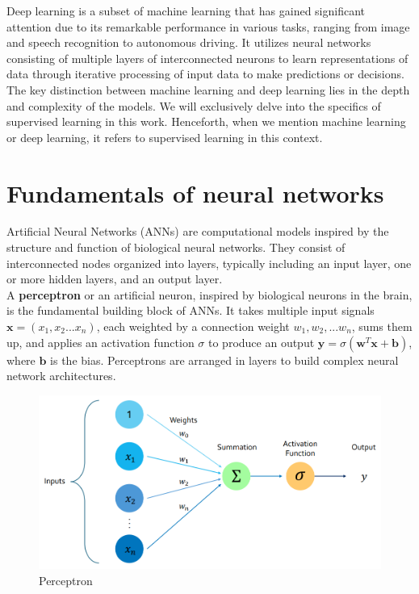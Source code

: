 Deep learning is a subset of machine learning that has gained significant attention due to its remarkable performance in various tasks, ranging from image and speech recognition to autonomous driving. It utilizes neural networks consisting of multiple layers of interconnected neurons to learn representations of data through iterative processing of input data to make predictions or decisions. The key distinction between machine learning and deep learning lies in the depth and complexity of the models. We will exclusively delve into the specifics of supervised learning in this work. Henceforth, when we mention machine learning or deep learning, it refers to supervised learning in this context.
\section{Fundamentals of neural networks}
Artificial Neural Networks (ANNs) are computational models inspired by the structure and function of biological neural networks. They consist of interconnected nodes organized into layers, typically including an input layer, one or more hidden layers, and an output layer. \\ 
A \textbf{perceptron} or an artificial neuron, inspired by biological neurons in the brain, is the fundamental building block of ANNs. It takes multiple input signals $\mathbf{x}= \left(x_1, x_2 ...x_n\right)$, each weighted by a connection weight $w_1,w_2,...w_n$, sums them up, and applies an activation function $\sigma$ to produce an output $\mathbf{y} = \sigma \left(\mathbf{w}^T\mathbf{x} + \mathbf{b} \right)$, where $\mathbf{b}$ is the bias. Perceptrons are arranged in layers to build complex neural network architectures.\\
\begin{figure}[ht]
    \centering
    \includegraphics[width=12cm]{images/Theory-DL/ActFn.png}
    \caption{Perceptron}
    \label{fig:Perceptron}
  \end{figure}
